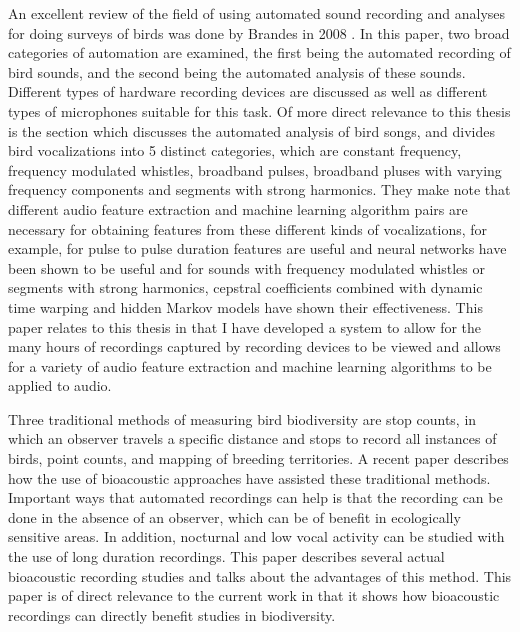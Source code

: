 \documentclass[12pt,oneside]{book}
\begin{document}
An excellent review of the field of using automated sound recording
and analyses for doing surveys of birds was done by Brandes in 2008
\cite{brandes2008automated}.  In this paper, two broad categories of
automation are examined, the first being the automated recording of
bird sounds, and the second being the automated analysis of these
sounds.  Different types of hardware recording devices are discussed
as well as different types of microphones suitable for this task.  Of
more direct relevance to this thesis is the section which discusses
the automated analysis of bird songs, and divides bird vocalizations
into 5 distinct categories, which are constant frequency, frequency
modulated whistles, broadband pulses, broadband pluses with varying
frequency components and segments with strong harmonics.  They make
note that different audio feature extraction and machine learning
algorithm pairs are necessary for obtaining features from these
different kinds of vocalizations, for example, for pulse to pulse
duration features are useful and neural networks have been shown to be
useful and for sounds with frequency modulated whistles or segments
with strong harmonics, cepstral coefficients combined with dynamic
time warping and hidden Markov models have shown their effectiveness.
This paper relates to this thesis in that I have developed a system
to allow for the many hours of recordings captured by recording
devices to be viewed and allows for a variety of audio feature
extraction and machine learning algorithms to be applied to audio.

Three traditional methods of measuring bird biodiversity are stop
counts, in which an observer travels a specific distance and stops to
record all instances of birds, point counts,
\cite{bardeli2010detecting} and mapping of breeding territories.  A
recent paper \cite{frommolt2008biodiversity} describes how the use of
bioacoustic approaches have assisted these traditional methods.
Important ways that automated recordings can help is that the
recording can be done in the absence of an observer, which can be of
benefit in ecologically sensitive areas.  In addition, nocturnal and
low vocal activity can be studied with the use of long duration
recordings.  This paper describes several actual bioacoustic recording
studies and talks about the advantages of this method.  This paper is
of direct relevance to the current work in that it shows how
bioacoustic recordings can directly benefit studies in biodiversity.
\end{document}
